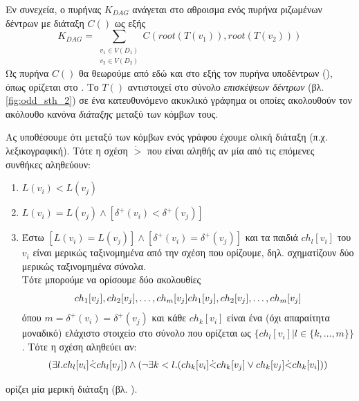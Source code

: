 Εν συνεχεία, ο πυρήνας $K_{DAG}$ ανάγεται στο αθροισμα ενός πυρήνα ριζωμένων δέντρων με διάταξη $C()$ ως εξής
\begin{equation}
K_{DAG} = \sum_{\substack{v_{1} \in V(D_{1}) \\ v_{2} \in V(D_{2})}} C(root(T(v_{1})), root(T(v_{2})))
\end{equation}
Ως πυρήνα $C()$ θα θεωρούμε από εδώ και στο εξής τον πυρήνα υποδέντρων (), όπως ορίζεται στο \cite{STKernel}. 
Το $T()$ αντιστοιχεί στο σύνολο \textit{επισκέψεων δέντρων} (βλ. \ref{fig:odd_sth_2}) σε ένα κατευθυνόμενο ακυκλικό γράφημα οι οποίες ακολουθούν τον ακόλουθο κανόνα \textit{διάταξης} μεταξύ των κόμβων τους.
\begin{definition}
Ας υποθέσουμε ότι μεταξύ των κόμβων ενός γράφου έχουμε ολική διάταξη (π.χ. λεξικογραφική).
Τότε η σχέση $\dot{>}$ που είναι αληθής αν μία από τις επόμενες συνθήκες αληθεύουν:
\begin{enumerate}
\item $L(v_{i}) < L(v_{j})$
\item $L(v_{i}) = L(v_{j}) \wedge [\delta^{+}(v_{i}) < \delta^{+}(v_{j})]$
\item Έστω $[L(v_{i}) = L(v_{j})] \wedge [\delta^{+}(v_{i}) = \delta^{+}(v_{j})]$ και τα παιδιά $ch_{l}[v_{i}]$ του $v_{i}$ είναι μερικώς ταξινομημένα από την σχέση που ορίζουμε, δηλ. σχηματίζουν δύο μερικώς ταξινομημένα σύνολα.\\
Τότε μπορούμε να ορίσουμε δύο ακολουθίες
$$
ch_{1}[v_{j}], ch_{2}[v_{j}], \dots, ch_{m}[v_{j}]\\
ch_{1}[v_{j}], ch_{2}[v_{j}], \dots, ch_{m}[v_{j}]
$$
όπου $m = \delta^{+}(v_{i}) = \delta^{+}(v_{j})$ και κάθε $ch_{k}[v_{i}]$ είναι ένα (όχι απαραίτητα μοναδικό) ελάχιστο στοιχείο στο σύνολο που ορίζεται ως $\{ch_{l}[v_{i}]|l\in \{k, \dots, m\}\}$.
Τότε η σχέση αληθεύει αν:
$$
(\exists l.ch_{l}[v_{i}]\dot{<}ch_{l}[v_{j}]) \wedge \\
(\neg \exists k < l.(ch_{k}[v_{i}]\dot{<}ch_{k}[v_{j}] \vee ch_{k}[v_{j}]\dot{<}ch_{k}[v_{i}]))
$$
\end{enumerate}
ορίζει μία μερική διάταξη (βλ. \cite[]{Martino2012ATK}).
\end{definition}


